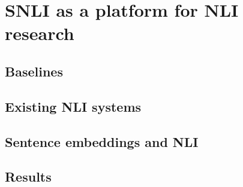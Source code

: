 \section{SNLI as a platform for NLI research}

\subsection{Baselines}

\subsection{Existing NLI systems}

\subsection{Sentence embeddings and NLI}

\subsection{Results}
